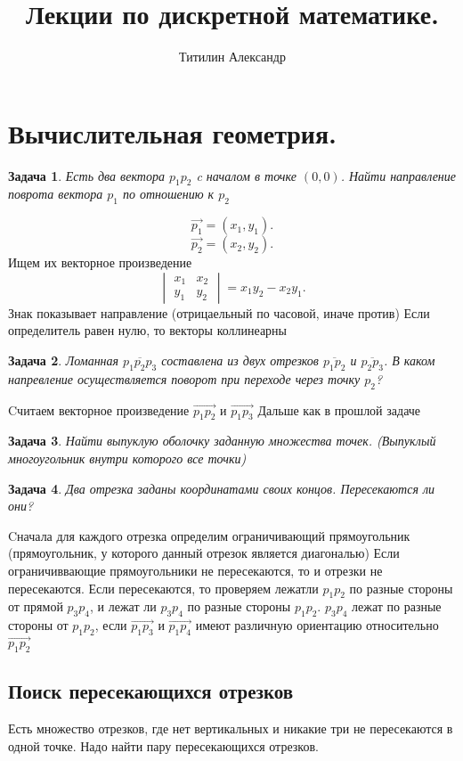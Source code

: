 \documentclass{scrartcl}
\title{Лекции по дискретной математике.}
\author{Титилин Александр}
\date{}
\newtheorem{task}{Задача}
\begin{document}
\maketitle
\section{Вычислительная геометрия.}
\begin{task}
    Есть два вектора $p_1 p_2$ c началом в точке $(0,0)$. Найти направление поврота вектора  $p_1$ по отношению к $p_2$ 
\end{task}
\[
\vec{p_1} = (x_1,y_1)
.\] 
\[
\vec{p_2} = (x_2,y_2)
.\] 
Ищем их векторное произведение
\[
    \begin{vmatrix}
        x_1 & x_2\\
        y_1 & y_2
    \end{vmatrix}  = x_1y_2 - x_2y_1
.\] 
Знак показывает направление (отрицаельный по часовой, иначе против)
Если определитель равен нулю, то векторы коллинеарны
\begin{task}
    Ломанная $\overline{p_1p_2p_3}$ составлена из двух отрезков $\overline{p_1p_2}$ и $\overline{p_2p_3}$. В каком напревление осуществляется поворот
    при переходе через точку $p_2$?
\end{task}
Cчитаем векторное произведение $\vec{p_1p_2}$ и $\vec{p_1p_3}$
Дальше как в прошлой задаче
\begin{task}
	Найти выпуклую оболочку заданную множества точек. (Выпуклый многоугольник внутри которого все точки)
\end{task}
\begin{task}
    Два отрезка заданы координатами своих концов. Пересекаются ли они?
\end{task}
Cначала для каждого отрезка определим ограничивающий прямоугольник (прямоугольник, у которого данный отрезок является диагональю)
Если ограничиввающие прямоугольники не пересекаются, то и отрезки не пересекаются.
Если пересекаются, то проверяем лежатли $p_1 p_2$ по разные стороны от прямой $p_3p_4$, и лежат ли $p_3 p_4$ по разные стороны $p_1p_2$. $p_3 p_4$ лежат по разные стороны от $p_1p_2$, если 
$\vec{p_1p_3}$ и $\vec{p_1p_4}$ имеют различную ориентацию относительно $\vec{p_1p_2}$
\subsection{Поиск пересекающихся отрезков}
Есть множество отрезков, где нет вертикальных и никакие три не пересекаются в одной точке. Надо найти пару пересекающихся отрезков.
\end{document}
